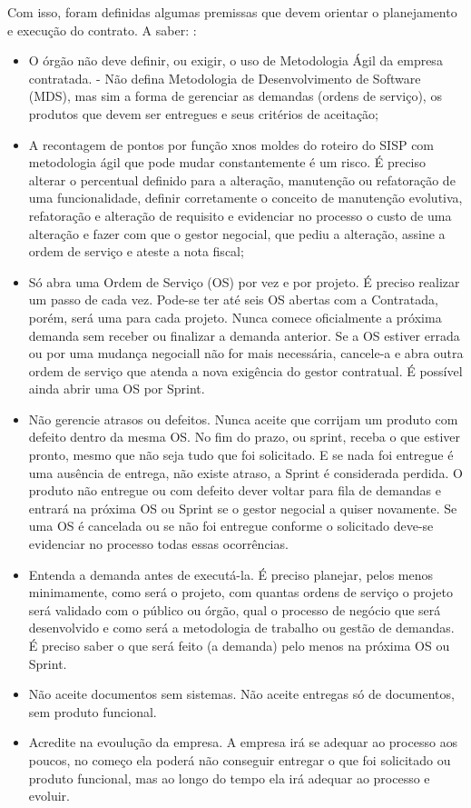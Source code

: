 Com isso, foram definidas algumas premissas que devem orientar o planejamento e execução do contrato. A saber:  \cite{parente}:
\begin{itemize}
\item O órgão não deve definir, ou exigir, o uso de Metodologia Ágil da empresa contratada. - Não defina Metodologia de Desenvolvimento de Software (MDS), mas sim a forma de gerenciar as demandas (ordens de serviço), os produtos que devem ser entregues e seus critérios de aceitação;
\item A recontagem de pontos por função xnos moldes do roteiro do SISP com metodologia ágil que pode mudar constantemente é um risco. É preciso alterar o percentual definido para a alteração, manutenção ou refatoração de uma funcionalidade, definir corretamente o conceito de manutenção evolutiva, refatoração e alteração de requisito e evidenciar no processo o custo de uma alteração e fazer com que o gestor negocial, que pediu a alteração, assine a ordem de serviço e ateste a nota fiscal;
\item Só abra uma Ordem de Serviço (OS) por vez e por projeto. É preciso realizar um passo de cada vez. Pode-se ter até seis OS abertas com a Contratada, porém, será uma para cada projeto. Nunca comece oficialmente a próxima demanda sem receber ou finalizar a demanda anterior. Se a OS estiver errada ou por uma mudança negociall não for mais necessária, cancele-a e abra outra ordem de serviço que atenda a nova exigência do gestor contratual. É possível ainda abrir uma OS por Sprint.
\item Não gerencie atrasos ou defeitos. Nunca aceite que corrijam um produto com defeito dentro da mesma OS. No fim do prazo, ou sprint, receba o que estiver pronto, mesmo que não seja tudo que foi solicitado. E se nada foi entregue é uma ausência de entrega, não existe atraso, a Sprint é considerada perdida. O produto não entregue ou com defeito dever voltar para fila de demandas e entrará na próxima OS ou Sprint se o gestor negocial a quiser novamente. Se uma OS é cancelada ou se não foi entregue conforme o solicitado deve-se evidenciar no processo todas essas ocorrências.
\item Entenda a demanda antes de executá-la. É preciso planejar, pelos menos minimamente, como será o projeto, com quantas ordens de serviço o projeto será validado com o público ou órgão, qual o processo de negócio que será desenvolvido e como será a metodologia de trabalho ou gestão de demandas. É preciso saber o que será feito (a demanda) pelo menos na próxima OS ou Sprint.
\item Não aceite documentos sem sistemas. Não aceite entregas só de documentos, sem produto funcional.
\item Acredite na evoulução da empresa. A empresa irá se adequar ao processo aos poucos, no começo ela poderá não conseguir entregar o que foi solicitado ou produto funcional, mas ao longo do tempo ela irá adequar ao processo e evoluir. 
\end{itemize} 

